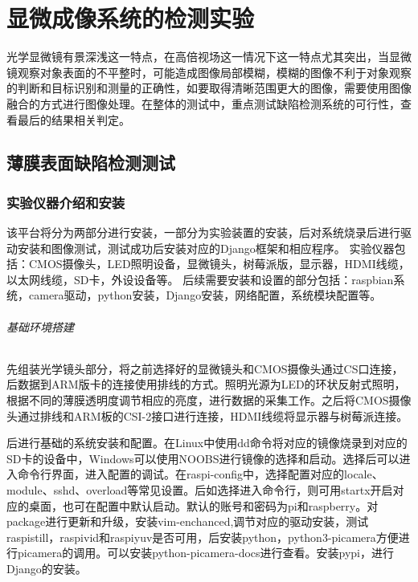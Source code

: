 \chapter{显微成像系统的检测实验}


光学显微镜有景深浅这一特点，在高倍视场这一情况下这一特点尤其突出，当显微镜观察对象表面的不平整时，可能造成图像局部模糊，模糊的图像不利于对象观察的判断和目标识别和测量的正确性，如要取得清晰范围更大的图像，需要使用图像融合的方式进行图像处理。在整体的测试中，重点测试缺陷检测系统的可行性，查看最后的结果相关判定。

\section{薄膜表面缺陷检测测试}

\subsection{实验仪器介绍和安装}
该平台将分为两部分进行安装，一部分为实验装置的安装，后对系统烧录后进行驱动安装和图像测试，测试成功后安装对应的Django框架和相应程序。
实验仪器包括：CMOS摄像头，LED照明设备，显微镜头，树莓派版，显示器，HDMI线缆，以太网线缆，SD卡，外设设备等。
后续需要安装和设置的部分包括：raspbian系统，camera驱动，python安装，Django安装，网络配置，系统模块配置等。
\subparagraph{基础环境搭建}

先组装光学镜头部分，将之前选择好的显微镜头和CMOS摄像头通过CS口连接，后数据到ARM版卡的连接使用排线的方式。照明光源为LED的环状反射式照明，根据不同的薄膜透明度调节相应的亮度，进行数据的采集工作。之后将CMOS摄像头通过排线和ARM板的CSI-2接口进行连接，HDMI线缆将显示器与树莓派连接。

后进行基础的系统安装和配置。在Linux中使用dd命令将对应的镜像烧录到对应的SD卡的设备中，Windows可以使用NOOBS进行镜像的选择和启动。选择后可以进入命令行界面，进入配置的调试。在raspi-config中，选择配置对应的locale、module、sshd、overload等常见设置。后如选择进入命令行，则可用startx开启对应的桌面，也可在配置中默认启动。默认的账号和密码为pi和raspberry。对package进行更新和升级，安装vim-enchanced,调节对应的驱动安装，测试raspistill，raspivid和raspiyuv是否可用，后安装python，python3-picamera方便进行picamera的调用。可以安装python-picamera-docs进行查看。安装pypi，进行Django的安装。


